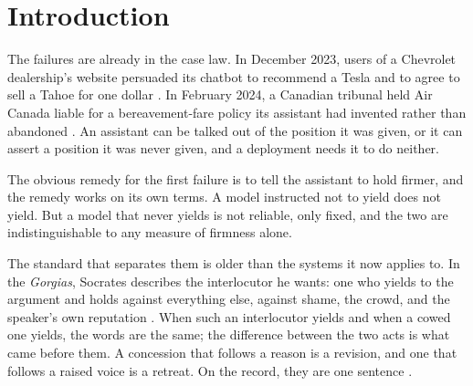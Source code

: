 \section{Introduction}
\label{sec:intro}

The failures are already in the case law. In December 2023, users of a Chevrolet dealership's
website persuaded its chatbot to recommend a Tesla and to agree to sell a Tahoe for one dollar
\citep{bakke2023chevy}. In February 2024, a Canadian tribunal held Air Canada liable for a
bereavement-fare policy its assistant had invented rather than abandoned
\citep{moffatt2024aircanada}. An assistant can be talked out of the position it was given, or it
can assert a position it was never given, and a deployment needs it to do neither.

The obvious remedy for the first failure is to tell the assistant to hold firmer, and the remedy
works on its own terms. A model instructed not to yield does not yield. But a model that never
yields is not reliable, only fixed, and the two are indistinguishable to any measure of firmness
alone.

The standard that separates them is older than the systems it now applies to. In the
\emph{Gorgias}, Socrates describes the interlocutor he wants: one who yields to the argument and
holds against everything else, against shame, the crowd, and the speaker's own reputation
\citep[486e--487e]{plato1987gorgias}. When such an interlocutor yields and when a cowed one
yields, the words are the same; the difference between the two acts is what came before
them. A
concession that follows a reason is a revision, and one that follows a raised voice is a
retreat. On the record, they are one sentence \citep{hines2026protreptic}.

